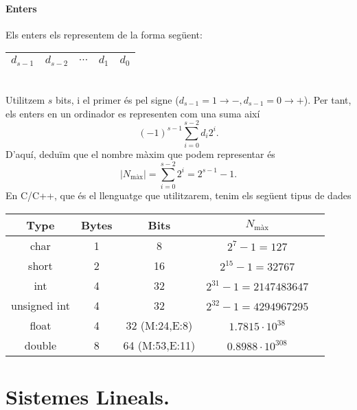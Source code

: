 \documentclass[11pt]{article}
\begin{document}
\paragraph{Enters}
Els enters els representem de la forma següent:\\
\begin{table}[h!]
    \centering
    \begin{tabular}{ |c|c|c|c|c| }
        \hline
        $d_{s-1}$ & $d_{s-2}$ & $\cdots$ & $d_1$ & $d_0$\\
        \hline
    \end{tabular}
\end{table}\\
Utilitzem $s$ bits, i el primer és pel signe ($d_{s-1}=1\rightarrow-,d_{s-1}=0\rightarrow+$). Per tant, els enters en un ordinador es representen com una suma així
\[
(-1)^{s-1}\sum_{i=0}^{s-2}d_i2^i.
\]
D'aquí, deduïm que el nombre màxim que podem representar és
\[
|N_{\textrm{màx}}|=\sum_{i=0}^{s-2}2^i=2^{s-1}-1.
\]
En C/C++, que és el llenguatge que utilitzarem, tenim els següent tipus de dades
\begin{table}[h!]
    \centering
    \begin{tabular}{ |c|c|c|c|c| }
        \hline
        \textbf{Type} & \textbf{Bytes} & \textbf{Bits} & $N_{\textrm{màx}}$\\
        \hline
        char & 1 & 8 & $2^7-1=127$\\
        \hline
        short & 2 & 16 & $2^{15}-1=32767$\\
        \hline
        int & 4 & 32 & $2^{31}-1=2147483647$\\
        \hline
        unsigned int & 4 & 32 & $2^{32}-1=4294967295$\\
        \hline
        float & 4 & 32 (M:24,E:8) & $1.7815\cdot10^{38}$\\
        \hline
        double & 8 & 64 (M:53,E:11) & $0.8988\cdot10^{308}$\\
        \hline
    \end{tabular}
\end{table}
\newpage
\section{Sistemes Lineals.}
\newpage
\end{document}

